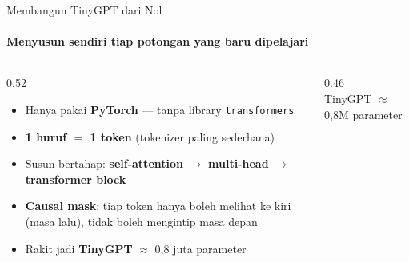 \documentclass[aspectratio=169,t]{beamer}
\begin{document}
\begin{frame}{Membangun TinyGPT dari Nol}
  \framesubtitle{Menyusun sendiri tiap potongan yang baru dipelajari}
  \begin{columns}[T]
    \begin{column}{0.52\textwidth}
      \begin{itemize}
        \footnotesize
        \item Hanya pakai \textbf{PyTorch} --- tanpa library \texttt{transformers}
        \item \textbf{1 huruf $=$ 1 token} (tokenizer paling sederhana)
        \item Susun bertahap: \textbf{self-attention} $\to$ \textbf{multi-head} $\to$ \textbf{transformer block}
        \item \textbf{Causal mask}: tiap token hanya boleh melihat ke kiri (masa lalu), tidak boleh mengintip masa depan
        \item Rakit jadi \textbf{TinyGPT} $\approx$ 0,8 juta parameter
      \end{itemize}
    \end{column}
    \begin{column}{0.46\textwidth}
      \centering
      \\[0.2em]
      {\tiny\color{nvgray}TinyGPT $\approx$ 0,8M parameter}
    \end{column}
  \end{columns}
\end{frame}
\end{document}
